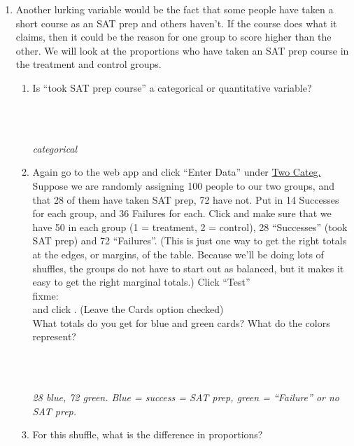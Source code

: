 \begin{enumerate}
\item Another lurking variable would be the fact that some people have
  taken a short course as an SAT prep and others haven't.  If the
  course does what it claims, then it could be the reason for one
  group to score higher than the other. We will look at the
  proportions who have taken an SAT prep course in the treatment and
  control groups.  
  \begin{enumerate}
  \item Is ``took SAT prep course'' a categorical or quantitative
    variable? 
\begin{students}
        \vspace{1cm}\\
\end{students}
\begin{key}
  \\ {\it categorical}
\end{key}
    \item Again go to the  web app and click ``Enter Data'' under
      \underline{Two Categ.}  Suppose 
      we are randomly assigning 100 people to our two groups, and that
      28 of them have taken SAT prep, 72 have not. Put in 14 Successes
      for each group, and 36 Failures for each.  Click  and make sure that we have 50 in each group (1 =
      treatment, 2 = control), 28 ``Successes'' (took SAT prep) and 72
      ``Failures''. (This is just one way to get the right totals at
      the edges, or margins, of the table.  Because we'll be doing
      lots of shuffles, the groups do not have to start out as balanced,
      but it makes it easy to get the right marginal totals.) Click 
      ``Test''\\
fixme:\\
      and  click .  (Leave the Cards option checked)\\
      What totals do you get for blue and green cards?  What do the
      colors represent?
\begin{students}
        \vspace{1cm}\\
\end{students}
\begin{key}
  \\ {\it 28 blue, 72 green. Blue = success  = SAT prep, green =
    ``Failure'' or no SAT prep.}
\end{key}
       \item For this shuffle, what is the difference in proportions? 

\end{enumerate}
\end{enumerate}
